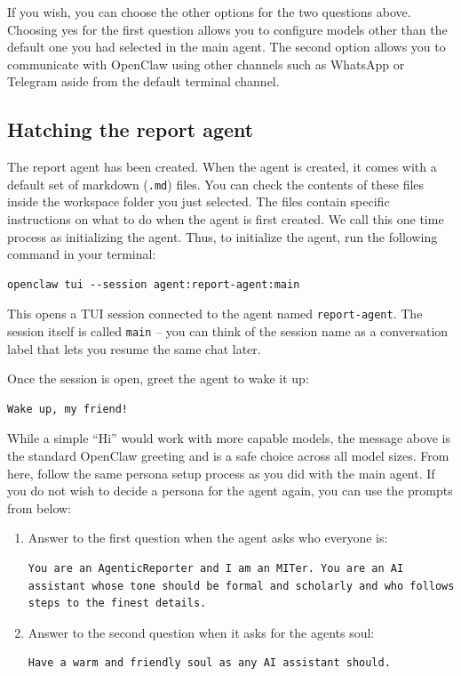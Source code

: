 \documentclass[12pt, a4paper]{article}
\begin{document}
\begin{notebox}
If you wish, you can choose the other options for the two questions above. Choosing yes for the first question allows you to configure models other than the default one you had selected in the main agent. The second option allows you to communicate with OpenClaw using other channels such as WhatsApp or Telegram aside from the default terminal channel.
\end{notebox}

\subsection{Hatching the report agent}

The report agent has been created. When the agent is created, it comes with a default set of markdown (\texttt{.md}) files. You can check the contents of these files inside the workspace folder you just selected. The files contain specific instructions on what to do when the agent is first created. We call this one time process as initializing the agent. Thus, to initialize the agent, run the following command in your terminal:

\begin{lstlisting}[style=shellstyle]
openclaw tui --session agent:report-agent:main
\end{lstlisting}

This opens a TUI session connected to the agent named \texttt{report-agent}. The session itself is called \texttt{main} -- you can think of the session name as a conversation label that lets you resume the same chat later.

Once the session is open, greet the agent to wake it up:

\begin{lstlisting}[style=plainstyle]
Wake up, my friend!
\end{lstlisting}

While a simple ``Hi'' would work with more capable models, the message above is the standard OpenClaw greeting and is a safe choice across all model sizes. From here, follow the same persona setup process as you did with the main agent. If you do not wish to decide a persona for the agent again, you can use the prompts from below:

\begin{enumerate}
    \item Answer to the first question when the agent asks who everyone is:
\begin{lstlisting}[style=plainstyle]
You are an AgenticReporter and I am an MITer. You are an AI assistant whose tone should be formal and scholarly and who follows steps to the finest details.
\end{lstlisting}
    \item Answer to the second question when it asks for the agents soul:
\begin{lstlisting}[style=plainstyle]
Have a warm and friendly soul as any AI assistant should.
\end{lstlisting}
\end{enumerate}
\end{document}
